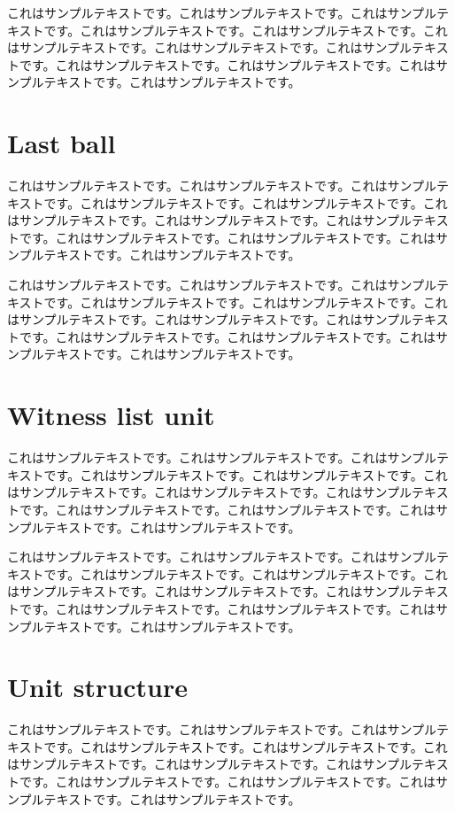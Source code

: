 \documentclass[a4paper, dvipdfmx]{jsarticle}
\begin{document}
これはサンプルテキストです。これはサンプルテキストです。これはサンプルテキストです。これはサンプルテキストです。これはサンプルテキストです。これはサンプルテキストです。これはサンプルテキストです。これはサンプルテキストです。これはサンプルテキストです。これはサンプルテキストです。これはサンプルテキストです。これはサンプルテキストです。

\section{Last ball}
これはサンプルテキストです。これはサンプルテキストです。これはサンプルテキストです。これはサンプルテキストです。これはサンプルテキストです。これはサンプルテキストです。これはサンプルテキストです。これはサンプルテキストです。これはサンプルテキストです。これはサンプルテキストです。これはサンプルテキストです。これはサンプルテキストです。

これはサンプルテキストです。これはサンプルテキストです。これはサンプルテキストです。これはサンプルテキストです。これはサンプルテキストです。これはサンプルテキストです。これはサンプルテキストです。これはサンプルテキストです。これはサンプルテキストです。これはサンプルテキストです。これはサンプルテキストです。これはサンプルテキストです。

\section{Witness list unit}
これはサンプルテキストです。これはサンプルテキストです。これはサンプルテキストです。これはサンプルテキストです。これはサンプルテキストです。これはサンプルテキストです。これはサンプルテキストです。これはサンプルテキストです。これはサンプルテキストです。これはサンプルテキストです。これはサンプルテキストです。これはサンプルテキストです。

これはサンプルテキストです。これはサンプルテキストです。これはサンプルテキストです。これはサンプルテキストです。これはサンプルテキストです。これはサンプルテキストです。これはサンプルテキストです。これはサンプルテキストです。これはサンプルテキストです。これはサンプルテキストです。これはサンプルテキストです。これはサンプルテキストです。

\section{Unit structure}
これはサンプルテキストです。これはサンプルテキストです。これはサンプルテキストです。これはサンプルテキストです。これはサンプルテキストです。これはサンプルテキストです。これはサンプルテキストです。これはサンプルテキストです。これはサンプルテキストです。これはサンプルテキストです。これはサンプルテキストです。これはサンプルテキストです。
\end{document}
